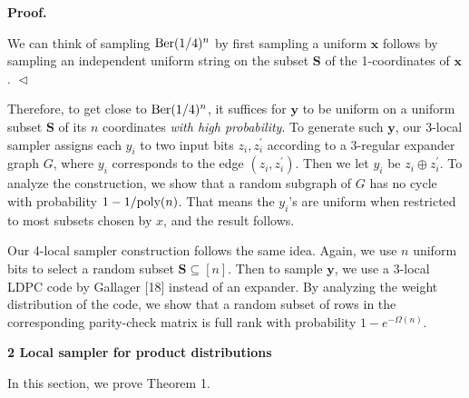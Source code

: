 


\par\medskip\noindent\textbf{
\textbf{Proof}.}\par




We can think of sampling $\textnormal{Ber}(1/4)^{n}$ by first sampling a uniform $\boldsymbol{x}$ follows by sampling an independent uniform string on the subset $\boldsymbol{S}$ of the 1-coordinates of $\boldsymbol{x}$.
$\vartriangleleft$\par




Therefore, to get close to $\textnormal{Ber}(1/4)^{n}$, it suffices for $\boldsymbol{y}$ to be uniform on a uniform subset $\boldsymbol{S}$ of its $n$ coordinates \emph{with high probability}.
To generate such $\boldsymbol{y}$, our 3-local sampler assigns each $y_{i}$ to two input bits $z_{i},z_{i}^{\prime}$ according to a 3-regular expander graph $G$, where $y_{i}$ corresponds to the edge $(z_{i},z_{i}^{\prime})$.
Then we let $y_{i}$ be $z_{i}\oplus z_{i}^{\prime}$.
To analyze the construction, we show that a random subgraph of $G$ has no cycle with probability $1-1/\textnormal{poly}(n)$.
That means the $y_{i}$’s are uniform when restricted to most subsets chosen by $x$, and the result follows.\par




Our 4-local sampler construction follows the same idea.
Again, we use $n$ uniform bits to select a random subset $\boldsymbol{S}\subseteq[n]$.
Then to sample $\boldsymbol{y}$, we use a $3$-local LDPC code by Gallager [18] instead of an expander.
By analyzing the weight distribution of the code, we show that a random subset of rows in the corresponding parity-check matrix is full rank with probability $1-e^{-\Omega(n)}$.\par








\par\medskip\noindent\textbf{
2 Local sampler for product distributions}\par




In this section, we prove Theorem 1.\par





